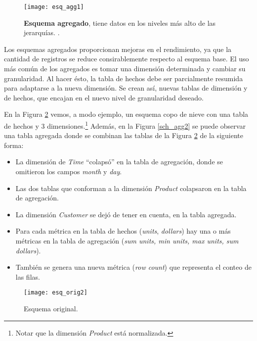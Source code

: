 \documentclass[a4paper,11pt]{article}
\begin{document}
    \begin{figure}
      \begin{center}
        \texttt{[image: esq\_agg1]}
        \caption{\textbf{Esquema agregado}, tiene datos en los niveles más alto de las jerarquías. \cite[p.~172]{nagabhushana}.}
        \label{sch_agg1}
      \end{center}
    \end{figure}
    
    
    Los esquemas agregados proporcionan mejoras en el rendimiento, ya que la cantidad de registros se reduce consirablemente respecto al esquema base. El
    uso más común de los agregados es tomar una dimensión determinada y cambiar su granularidad. Al hacer ésto, la tabla de hechos debe ser parcialmente
    resumida para adaptarse a la nueva dimensión. Se crean así, nuevas tablas de dimensión y de hechos, que encajan en el nuevo nivel de granularidad deseado.
    
    En la Figura \ref{sch_orig2} vemos, a modo ejemplo, un esquema copo de nieve con una tabla de hechos y 3 dimensiones.\footnote{Notar que la
    dimensión \textit{Product} está normalizada.} Además, en la Figura \ref{sch_agg2} se puede observar una tabla agregada donde se combinan las tablas de la
    Figura \ref{sch_orig2} de la siguiente forma:
    
    \begin{itemize}
      \item La dimensión de \textit{Time} ``colapsó'' en la tabla de agregación, donde se omitieron los campos \textit{month} y \textit{day}.
      \item Las dos tablas que conforman a la dimensión \textit{Product} colapsaron en la tabla de agregación.
      \item La dimensión \textit{Customer} se dejó de tener en cuenta, en la tabla agregada.
      \item Para cada métrica en la tabla de hechos (\textit{units}, \textit{dollars}) hay una o más métricas en la tabla de 
      agregación (\textit{sum units, min units, max units, sum dollars}).
      \item También se genera una nueva métrica (\textit{row count}) que representa el conteo de las filas.
    \end{itemize}
    
    \begin{figure}
      \begin{center}
        \texttt{[image: esq\_orig2]}
        \caption{Esquema original. \cite{agg_tables}}
        \label{sch_orig2}
      \end{center}
    \end{figure}
    
\end{document}
